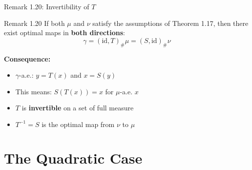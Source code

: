 \documentclass[aspectratio=169]{beamer}
\begin{document}
\begin{frame}{Remark 1.20: Invertibility of $T$}
\begin{block}{Remark 1.20}
If both $\mu$ and $\nu$ satisfy the assumptions of Theorem 1.17, then there exist optimal maps in \textbf{both directions}:
\[
\gamma = (\text{id}, T)_\# \mu = (S, \text{id})_\# \nu
\]
\end{block}

\vspace{0.3cm}
\textbf{Consequence:}
\begin{itemize}
    \item $\gamma$-a.e.: $y = T(x)$ and $x = S(y)$
    \item This means: $S(T(x)) = x$ for $\mu$-a.e. $x$
    \item $T$ is \textbf{invertible} on a set of full measure
    \item $T^{-1} = S$ is the optimal map from $\nu$ to $\mu$
\end{itemize}

\vspace{0.3cm}
\begin{center}
\end{center}
\end{frame}

\section{The Quadratic Case}
\end{document}
